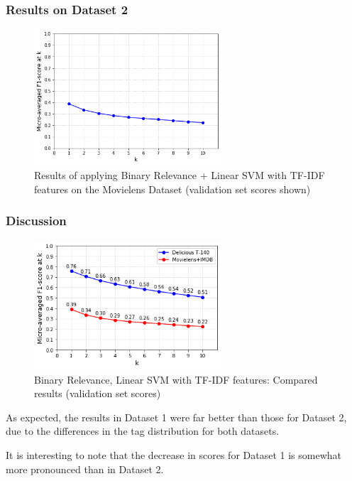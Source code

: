 \subsubsection{Results on Dataset 2}

\begin{figure}[H]
    \centering
    \includegraphics[width=7cm]{chapters/05_experiments/images/svm-tf-idf-movielens.png}
    \caption{Results of applying Binary Relevance + Linear SVM with TF-IDF features on the Movielens Dataset (validation set scores shown)}
    \label{fig:ovr_svm_movielens}
\end{figure}

\subsubsection{Discussion}

\begin{figure}[H]
    \centering
    \includegraphics[width=7cm]{chapters/05_experiments/images/proposal-1-compared-ovr-svm-bow.png}
    \caption{Binary Relevance, Linear SVM with TF-IDF features: Compared results (validation set scores)}
    \label{fig:compared_ovr_svm}
\end{figure}

As expected, the results in Dataset 1 were far better than those for Dataset 2, due to the differences in the tag distribution for both datasets.

It is interesting to note that the decrease in scores for Dataset 1 is somewhat more pronounced than in Dataset 2.

